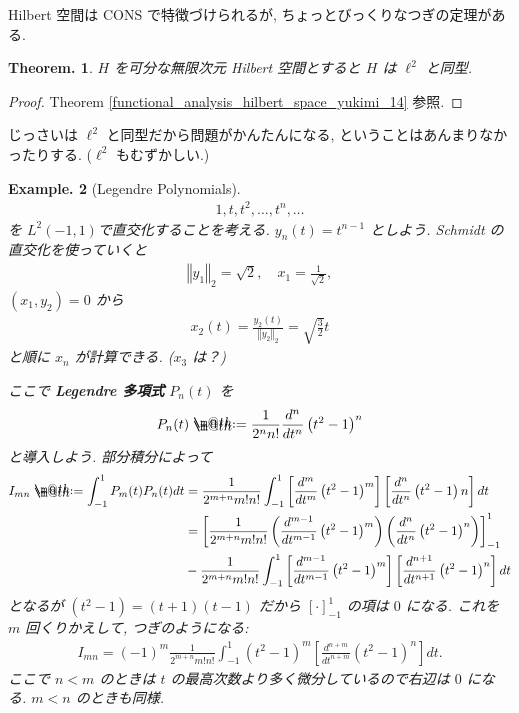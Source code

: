 \documentclass[openany, a4paper, oneside]{jsbook}
\makeatletter
\newcommand*{\defeq}{\mathrel{\rlap{%
\raisebox{0.3ex}{$\m@th\cdot$}}%
\raisebox{-0.3ex}{$\m@th\cdot$}}%
=}
\theoremstyle{break}
\newtheorem{thm}{Theorem.}[section]
\theoremstyle{breakdefn}
\newtheorem{ex}[thm]{Example.}
\newcommand{\norm}[1]{\left\Vert#1\right\Vert}
\newcommand{\rbk}[1]{\left (#1\right)}
\newcommand{\sqbk}[1]{\left[#1\right]}
\makeatother
\begin{document}
Hilbert 空間は CONS で特徴づけられるが,
ちょっとびっくりなつぎの定理がある.
\begin{thm}
 $H$ を可分な無限次元 Hilbert 空間とすると $H$ は $\ell^2$ と同型.
\end{thm}
\begin{proof}
Theorem \ref{functional_analysis_hilbert_space_yukimi_14} 参照.
\end{proof}
じっさいは $\ell^2$ と同型だから問題がかんたんになる,
ということはあんまりなかったりする.
($\ell^2$ もむずかしい.)

\begin{ex}[Legendre Polynomials]
\begin{align}
 1, t, t^2, \dots, t^n, \dots
\end{align}
を $L^2(-1, 1) $で直交化することを考える.
$y_n(t) = t^{n-1}$ としよう.
Schmidt の直交化を使っていくと
\begin{align}
 \norm{y_1}_2
 =
 \sqrt{2}, \quad
 x_1
 =
 \frac{1}{\sqrt{2}},
\end{align}
$(x_1, y_2) = 0$ から
\begin{align}
 x_2(t)
 =
 \frac{y_2(t)}{\norm{y_2}_2}
 =
 \sqrt{\frac{3}{2}}t
\end{align}
と順に $x_n$ が計算できる.
($x_3$ は？)

ここで \textbf{Legendre 多項式} $P_n(t)$ を
\begin{align}
 P_n(t)
 \defeq
 \frac{1}{2^n n!} \frac{d^n}{dt^n} \rbk{t^2 - 1}^n
\end{align}
と導入しよう.
部分積分によって
\begin{align}
 I_{mn}
 \defeq
 \int_{-1}^1 P_m(t) P_n(t) dt
 &=
 \frac{1}{2^{m+n} m!n!} \int_{-1}^1
  \sqbk{\frac{d^m}{dt^m} \rbk{t^2 - 1}^m}
  \sqbk{\frac{d^n}{dt^n} \rbk{t^2 - 1}n} dt \\
 &=
 \sqbk{\frac{1}{2^{m+n} m!n!} \rbk{\frac{d^{m-1}}{dt^{m-1}} \rbk{t^2 - 1}^m} \rbk{\frac{d^n}{dt^n} \rbk{t^2 - 1}^n}}_{-1}^1 \\
 &-
  \frac{1}{2^{m+n} m!n!} \int_{-1}^1
   \sqbk{\frac{d^{m-1}}{dt^{m-1}} \rbk{t^2 - 1}^m}
   \sqbk{\frac{d^{n+1}}{dt^{n+1}} \rbk{t^2 - 1}^n} dt
\end{align}
となるが $(t^2 - 1) = (t+1)(t-1)$ だから $[\cdot]_{-1}^1$ の項は $0$ になる.
これを $m$ 回くりかえして, つぎのようになる:
\begin{align}
 I_{mn}
 =
 (-1)^m \frac{1}{2^{m+n} m!n!} \int_{-1}^1
  \rbk{t^2 - 1}^m
  \sqbk{\frac{d^{n+m}}{dt^{n+m}} \rbk{t^2 - 1}^n} dt.
\end{align}
ここで $n<m$ のときは $t$ の最高次数より多く微分しているので右辺は $0$ になる.
$m<n$ のときも同様.


\end{ex}
\end{document}
